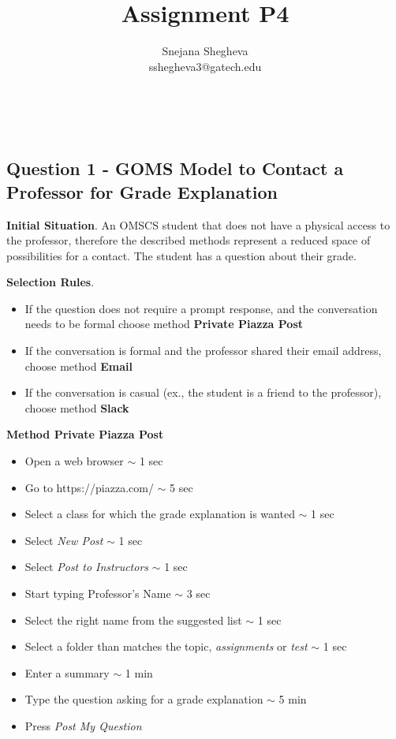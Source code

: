 \documentclass[12pt,letterpaper]{article}
\makeatletter
\renewcommand{\maketitle}{\bgroup
   \begin{center}
   \textbf{{\fontsize{18pt}{20}\selectfont \@title}}\\
   \vspace{10pt}
   {\fontsize{12pt}{0}\selectfont \@author} 
   \end{center}
}
\makeatother
\begin{document}
\title{Assignment P4}
\author{Snejana Shegheva \\ sshegheva3@gatech.edu}

\maketitle
\thispagestyle{fancy}

\subsection*{Question 1 - GOMS Model to Contact a Professor for Grade Explanation}

\textbf{Initial Situation}. An OMSCS student that does not have a physical access to the professor, therefore the described methods represent a reduced space of possibilities for a contact. The student has a question about their grade.

\textbf{Selection Rules}.

\begin{itemize}
    \itemsep0em 
    \item If the question does not require a prompt response, and the conversation needs to be formal choose method \textbf{Private Piazza Post}
    \item If the conversation is formal and the professor shared their email address, choose method \textbf{Email}
    \item If the conversation is casual (ex., the student is a friend to the professor), choose method \textbf{Slack}
\end{itemize}

\textbf{Method Private Piazza Post}

\begin{itemize}
    \itemsep-0.2em 
    \item Open a web browser  $\sim$ 1 sec
    \item Go to https://piazza.com/ $\sim$ 5 sec 
    \item Select a class for which the grade explanation is wanted $\sim$ 1 sec
    \item Select \textit{New Post} $\sim$ 1 sec
    \item Select \textit{Post to Instructors} $\sim$ 1 sec
    \item Start typing Professor's Name  $\sim$ 3 sec
    \item Select the right name from the suggested list $\sim$ 1 sec
    \item Select a folder than matches the topic, \textit{assignments} or \textit{test} $\sim$ 1 sec
    \item Enter a summary $\sim$ 1 min
    \item Type the question asking for a grade explanation $\sim$ 5 min
    \item Press \textit{Post My Question}
\end{itemize}
\end{document}
